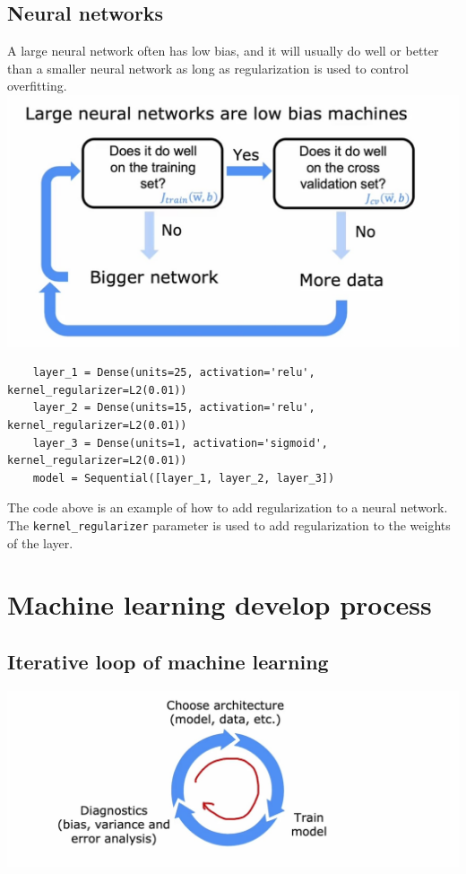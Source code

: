 \subsection*{Neural networks}
A large neural network often has low bias, and it will usually do well or better than a smaller neural network
as long as regularization is used to control overfitting.
\\
\includegraphics*[width=\textwidth]{images/10.17}
\par
\begin{verbatim}
    layer_1 = Dense(units=25, activation='relu', kernel_regularizer=L2(0.01))
    layer_2 = Dense(units=15, activation='relu', kernel_regularizer=L2(0.01))
    layer_3 = Dense(units=1, activation='sigmoid', kernel_regularizer=L2(0.01))
    model = Sequential([layer_1, layer_2, layer_3])
\end{verbatim}
\par
The code above is an example of how to add regularization to a neural network. 
The \texttt{kernel\_regularizer} parameter is used to add regularization to the weights of the layer.

\section{Machine learning develop process}
\subsection*{Iterative loop of machine learning}
\includegraphics*[width=\textwidth]{images/10.18}
